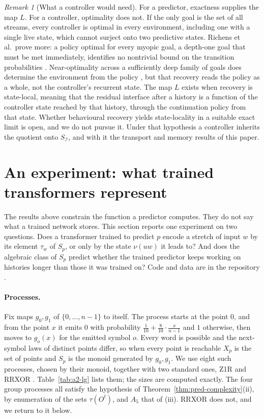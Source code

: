 \documentclass[10pt]{article}
\theoremstyle{definition}
\theoremstyle{remark}
\newtheorem{remark}[theorem]{Remark}
\newcommand{\Obs}{O}
\begin{document}
\begin{remark}[What a controller would need]
\label{rem:controllers}
For a predictor, exactness supplies the map $L$.  For a controller,
optimality does not.  If the only goal is the set of all streams,
every controller is optimal in every environment, including one with
a single live state, which cannot surject onto two predictive
states.  Richens et al.\ prove more: a policy optimal for every
myopic goal, a depth-one goal that must be met immediately, identifies no nontrivial bound on the transition
probabilities \cite{Richens2025}.  Near-optimality across a
sufficiently deep family of goals does determine the environment
from the policy \cite{Richens2025,Cifuentes2026}, but that recovery
reads the policy as a whole, not the controller's recurrent state.
The map $L$ exists when recovery is state-local, meaning that the
residual interface after a history is a function of the controller
state reached by that history, through the continuation policy from
that state.  Whether behavioural recovery yields state-locality in a
suitable exact limit is open, and we do not pursue it.  Under that
hypothesis a controller inherits the quotient onto $S_{\mathcal I}$,
and with it the transport and memory results of this paper.
\end{remark}

\section{An experiment: what trained transformers represent}
\label{sec:experiment}

The results above constrain the function a predictor computes.  They
do not say what a trained network stores.  This section reports one
experiment on two questions.  Does a transformer trained to predict
$p$ encode a stretch of input $w$ by its element $\tau_w$ of $S_p$,
or only by the state $\nu(uw)$ it leads to?  And does the algebraic
class of $S_p$ predict whether the trained predictor keeps working on
histories longer than those it was trained on?  Code and data are in
the repository \cite{DovetailRepo}.

\paragraph{Processes.}
Fix maps $g_0,g_1$ of $\{0,\ldots,n-1\}$ to itself.  The process
starts at the point $0$, and from the point $x$ it emits $0$ with
probability $\tfrac1{10}+\tfrac8{10}\cdot\tfrac{x}{n-1}$ and $1$
otherwise, then moves to $g_o(x)$ for the emitted symbol $o$.  Every
word is possible and the next-symbol laws of distinct points differ,
so when every point is reachable $X_p$ is the set of points and $S_p$
is the monoid generated by $g_0,g_1$.  We use eight such processes,
chosen by their monoid, together with two standard ones, Z1R and
RRXOR \cite{ShaiEtAl2024}.  Table~\ref{tab:a2-lg} lists them; the
sizes are computed exactly.  The four group processes all satisfy
the hypothesis of Theorem~\ref{thm:pred-complexity}(ii), by
enumeration of the sets $\tau(\Obs^t)$, and $A_5$ that of (iii).
RRXOR does not, and we return to it below.
\end{document}
